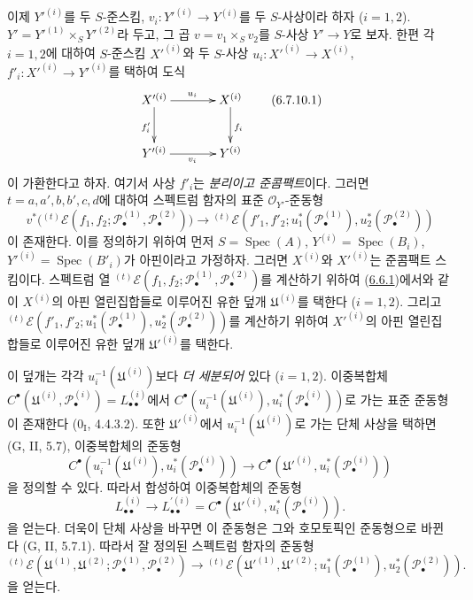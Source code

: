 \begin{env}[6.7.10]
\label{III.6.7.10-fr}
이제 $Y'^{(i)}$를 두 $S$-준스킴,
$v_i:Y'^{(i)}\to Y^{(i)}$를 두 $S$-사상이라 하자 ($i=1,2$).
$Y'=Y'^{(1)}\times_S Y'^{(2)}$라 두고, 그 곱
$v=v_1\times_S v_2$를 $S$-사상 $Y'\to Y$로 보자. 한편 각
$i=1,2$에 대하여 $S$-준스킴 $X'^{(i)}$와 두 $S$-사상
$u_i:X'^{(i)}\to X^{(i)}$, $f'_i:X'^{(i)}\to Y'^{(i)}$를 택하여
도식
\[
\xymatrix@C=36pt@R=28pt{
  X'^{(i)}\ar[r]^{u_i}\ar[d]_{f'_i}
  & X^{(i)}\ar[d]^{f_i}
  \\
  Y'^{(i)}\ar[r]_{v_i}
  & Y^{(i)}
}
\tag{6.7.10.1}\label{III.6.7.10.1.fr}
\]
이 가환한다고 하자. 여기서 사상 $f'_i$는 \emph{분리이고
준콤팩트}이다. 그러면 $t=a,a',b,b',c,d$에 대하여 스펙트럼 함자의
표준 $\mathscr O_{Y'}$-준동형
\[
  v^*\bigl({}^{(t)}\mathscr E
  (f_1,f_2;\mathscr P_\bullet^{(1)},\mathscr P_\bullet^{(2)})\bigr)
  \longrightarrow
  {}^{(t)}\mathscr E
  (f'_1,f'_2;u_1^*(\mathscr P_\bullet^{(1)}),
                 u_2^*(\mathscr P_\bullet^{(2)}))
  \tag{6.7.10.2}\label{III.6.7.10.2.fr}
\]
이 존재한다. 이를 정의하기 위하여 먼저
$S=\operatorname{Spec}(A)$,
$Y^{(i)}=\operatorname{Spec}(B_i)$,
$Y'^{(i)}=\operatorname{Spec}(B'_i)$가 아핀이라고 가정하자. 그러면
$X^{(i)}$와 $X'^{(i)}$는 준콤팩트 스킴이다. 스펙트럼 열
$ {}^{(t)}\mathscr E
(f_1,f_2;\mathscr P_\bullet^{(1)},\mathscr P_\bullet^{(2)})$를
계산하기 위하여 (\hyperref[III.6.6.1-fr]{6.6.1})에서와 같이
$X^{(i)}$의 아핀 열린집합들로 이루어진 유한 덮개
$\mathfrak U^{(i)}$를 택한다 ($i=1,2$). 그리고
$ {}^{(t)}\mathscr E
(f'_1,f'_2;u_1^*(\mathscr P_\bullet^{(1)}),
u_2^*(\mathscr P_\bullet^{(2)}))$를 계산하기 위하여
$X'^{(i)}$의 아핀 열린집합들로 이루어진 유한
덮개 $\mathfrak U'^{(i)}$를 택한다.


이 덮개는 각각 $u_i^{-1}(\mathfrak U^{(i)})$보다
\emph{더 세분되어} 있다 ($i=1,2$). 이중복합체
$C^\bullet(\mathfrak U^{(i)},\mathscr P_\bullet^{(i)})
=L_{\bullet\bullet}^{(i)}$에서
$C^\bullet(u_i^{-1}(\mathfrak U^{(i)}),
u_i^*(\mathscr P_\bullet^{(i)}))$로 가는 표준 준동형이 존재한다
($0_{\mathrm I}$, 4.4.3.2). 또한 $\mathfrak U'^{(i)}$에서
$u_i^{-1}(\mathfrak U^{(i)})$로 가는 단체 사상을 택하면
(G, II, 5.7), 이중복합체의 준동형
\[
  C^\bullet(u_i^{-1}(\mathfrak U^{(i)}),u_i^*(\mathscr P_\bullet^{(i)}))
  \longrightarrow
  C^\bullet(\mathfrak U'^{(i)},u_i^*(\mathscr P_\bullet^{(i)}))
\]
을 정의할 수 있다. 따라서 합성하여 이중복합체의 준동형
\[
  L_{\bullet\bullet}^{(i)}
  \longrightarrow
  L_{\bullet\bullet}^{\prime(i)}
  =C^\bullet(\mathfrak U'^{(i)},u_i^*(\mathscr P_\bullet^{(i)})).
\]
을 얻는다. 더욱이 단체 사상을 바꾸면 이 준동형은 그와 호모토픽인
준동형으로 바뀐다 (G, II, 5.7.1). 따라서 잘 정의된 스펙트럼 함자의
준동형
\[
  {}^{(t)}\mathscr E
  (\mathfrak U^{(1)},\mathfrak U^{(2)};
   \mathscr P_\bullet^{(1)},\mathscr P_\bullet^{(2)})
  \longrightarrow
  {}^{(t)}\mathscr E
  (\mathfrak U'^{(1)},\mathfrak U'^{(2)};
   u_1^*(\mathscr P_\bullet^{(1)}),u_2^*(\mathscr P_\bullet^{(2)})).
  \tag{6.7.10.3}\label{III.6.7.10.3.fr}
\]
을 얻는다.


\end{env}
